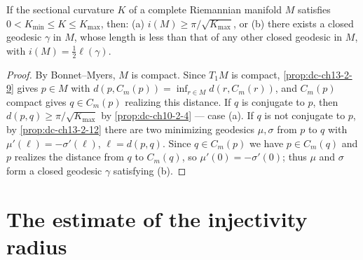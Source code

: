 \begin{proposition}
  \label{prop:dc-ch13-2-13}
  If the sectional curvature $K$ of a complete Riemannian manifold $M$ satisfies
  $0<K_{\min}\leq K\leq K_{\max}$, then:
  (a) $i(M)\geq\pi/\sqrt{K_{\max}}$, or
  (b) there exists a closed geodesic $\gamma$ in $M$, whose length is less than that
    of any other closed geodesic in $M$, with $i(M)=\tfrac{1}{2}\ell(\gamma)$.
\end{proposition}
\begin{proof}
\sketch
  By Bonnet--Myers, $M$ is compact. Since $T_1M$ is
  compact, \cref{prop:dc-ch13-2-9} gives $p\in M$ with $d(p,C_m(p))=\inf_{r\in M}d(r,C_m(r))$,
  and $C_m(p)$ compact gives $q\in C_m(p)$ realizing this distance. If $q$ is conjugate
  to $p$, then $d(p,q)\geq\pi/\sqrt{K_{\max}}$ by \cref{prop:dc-ch10-2-4} — case
  (a). If $q$ is not conjugate to $p$, by \cref{prop:dc-ch13-2-12} there are two minimizing
  geodesics $\mu,\sigma$ from $p$ to $q$ with $\mu'(\ell)=-\sigma'(\ell)$,
  $\ell=d(p,q)$. Since $q\in C_m(p)$ we have $p\in C_m(q)$ and $p$ realizes the
  distance from $q$ to $C_m(q)$, so $\mu'(0)=-\sigma'(0)$; thus $\mu$ and $\sigma$ form
  a closed geodesic $\gamma$ satisfying (b).
\end{proof}

\section{The estimate of the injectivity radius}

